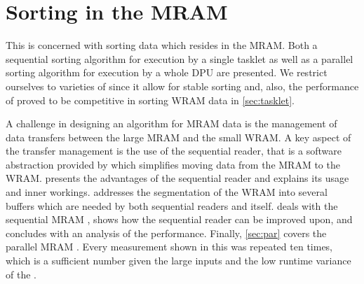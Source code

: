 \chapter[Sorting in the \texorpdfstring{\abb{MRAM}}{MRAM}]{Sorting in the \acs*{MRAM}}
\label{sec:mram}

This  is concerned with sorting data which resides in the \ac{MRAM}.
Both a sequential sorting algorithm for execution by a single tasklet as well as a parallel sorting algorithm for execution by a whole \ac{DPU} are presented.
We restrict ourselves to varieties of \MS{} since it allow for stable sorting and, also, the performance of \MS{} proved to be competitive in sorting \ac{WRAM} data in \cref{sec:tasklet}.

A challenge in designing an algorithm for \ac{MRAM} data is the management of data transfers between the large \ac{MRAM} and the small \ac{WRAM}.
A key aspect of the transfer management is the use of the sequential reader, that is a software abstraction provided by \upmem{} which simplifies moving data from the \ac{MRAM} to the \ac{WRAM}.
 presents the advantages of the sequential reader and explains its usage and inner workings.
 addresses the segmentation of the \ac{WRAM} into several buffers which are needed by both sequential readers and \MS{} itself.
 deals with the sequential \ac{MRAM} \MS{}, shows how the sequential reader can be improved upon, and concludes with an analysis of the performance.
Finally, \cref{sec:par} covers the parallel \ac{MRAM} \MS{}.
Every measurement shown in this  was repeated ten times, which is a sufficient number given the large inputs and the low runtime variance of the \MS*{}.






